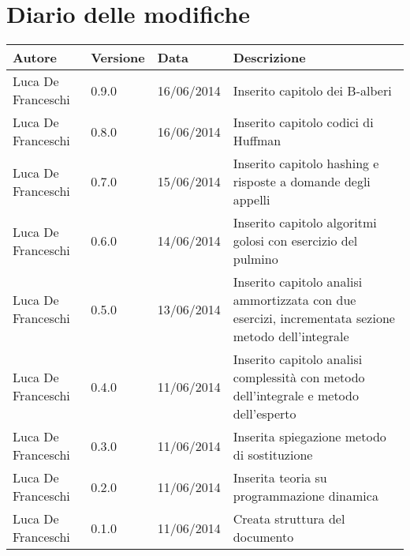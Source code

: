 \section*{Diario delle modifiche}

\begin{center}

	\begin{table}[htpd]
		\begin{tabular}{| l | l | l | p{50mm} |}
			\hline
			\hline
			\textbf{Autore} & \textbf{Versione} & \textbf{Data} & \textbf{Descrizione} \\
			\hline
			\hline 
			Luca De Franceschi & 0.9.0 & 16/06/2014 & Inserito capitolo dei B-alberi \\ \hline
			Luca De Franceschi & 0.8.0 & 16/06/2014 & Inserito capitolo codici di Huffman \\ \hline
			Luca De Franceschi & 0.7.0 & 15/06/2014 & Inserito capitolo hashing e risposte a domande degli appelli \\ \hline
			Luca De Franceschi & 0.6.0 & 14/06/2014 & Inserito capitolo algoritmi golosi con esercizio del pulmino \\ \hline
			Luca De Franceschi & 0.5.0 & 13/06/2014 & Inserito capitolo analisi ammortizzata con due esercizi, incrementata sezione metodo dell'integrale \\ \hline
			Luca De Franceschi & 0.4.0 & 11/06/2014 & Inserito capitolo analisi complessità con metodo dell'integrale e metodo dell'esperto \\ \hline
			Luca De Franceschi & 0.3.0 & 11/06/2014 & Inserita spiegazione metodo di sostituzione \\ \hline
			Luca De Franceschi & 0.2.0 & 11/06/2014 & Inserita teoria su programmazione dinamica \\ \hline
			Luca De Franceschi & 0.1.0 & 11/06/2014 & Creata struttura del documento \\ \hline
		\end{tabular}
	\end{table}
	
\end{center}